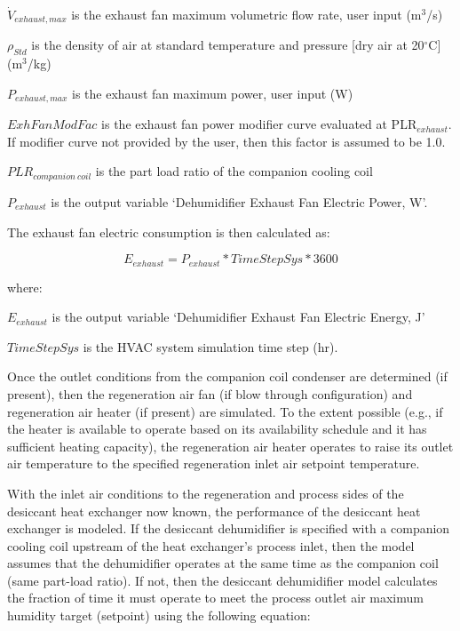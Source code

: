 \({\dot{V}_{exhaust,max}}\) is the exhaust fan maximum volumetric flow rate, user input (m\(^{3}\)/s)

\({\rho_{Std}}\) is the density of air at standard temperature and pressure {[}dry air at 20$^\circ$C{]} (m\(^{3}\)/kg)

\({P_{exhaust,max}}\) is the exhaust fan maximum power, user input (W)

\(ExhFanModFac\) is the exhaust fan power modifier curve evaluated at PLR\(_{exhaust}\). If modifier curve not provided by the user, then this factor is assumed to be 1.0.

\(PL{R_{companion~coil}}\) is the part load ratio of the companion cooling coil

\({P_{exhaust}}\) is the output variable `Dehumidifier Exhaust Fan Electric Power, W'.

The exhaust fan electric consumption is then calculated as:

\begin{equation}
{E_{exhaust}} = {P_{exhaust}}*TimeStepSys*3600
\end{equation}

where:

\({E_{exhaust}}\) is the output variable `Dehumidifier Exhaust Fan Electric Energy, J'

\(TimeStepSys\) is the HVAC system simulation time step (hr).

Once the outlet conditions from the companion coil condenser are determined (if present), then the regeneration air fan (if blow through configuration) and regeneration air heater (if present) are simulated. To the extent possible (e.g., if the heater is available to operate based on its availability schedule and it has sufficient heating capacity), the regeneration air heater operates to raise its outlet air temperature to the specified regeneration inlet air setpoint temperature.

With the inlet air conditions to the regeneration and process sides of the desiccant heat exchanger now known, the performance of the desiccant heat exchanger is modeled. If the desiccant dehumidifier is specified with a companion cooling coil upstream of the heat exchanger's process inlet, then the model assumes that the dehumidifier operates at the same time as the companion coil (same part-load ratio). If not, then the desiccant dehumidifier model calculates the fraction of time it must operate to meet the process outlet air maximum humidity target (setpoint) using the following equation:

